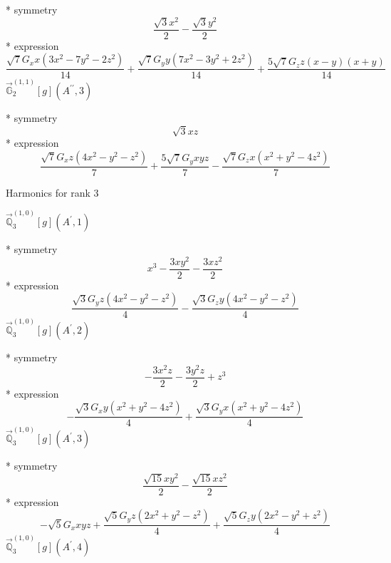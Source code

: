 \documentclass[fleqn,8pt]{jsarticle}
\begin{document}
\noindent\quad ** symmetry
\begin{dmath*}
\frac{\sqrt{3} x^{2}}{2} - \frac{\sqrt{3} y^{2}}{2}
\end{dmath*}
\noindent\quad ** expression
\begin{dmath*}
\frac{\sqrt{7} G_{x} x \left(3 x^{2} - 7 y^{2} - 2 z^{2}\right)}{14} + \frac{\sqrt{7} G_{y} y \left(7 x^{2} - 3 y^{2} + 2 z^{2}\right)}{14} + \frac{5 \sqrt{7} G_{z} z \left(x - y\right) \left(x + y\right)}{14}
\end{dmath*}
\noindent\quad $\vec{\mathbb{G}}_{2}^{(1,1)}[g](A^{\prime\prime},3)$

\noindent\quad ** symmetry
\begin{dmath*}
\sqrt{3} x z
\end{dmath*}
\noindent\quad ** expression
\begin{dmath*}
\frac{\sqrt{7} G_{x} z \left(4 x^{2} - y^{2} - z^{2}\right)}{7} + \frac{5 \sqrt{7} G_{y} x y z}{7} - \frac{\sqrt{7} G_{z} x \left(x^{2} + y^{2} - 4 z^{2}\right)}{7}
\end{dmath*}

\noindent * Harmonics for rank 3

\noindent\quad $\vec{\mathbb{Q}}_{3}^{(1,0)}[g](A^{\prime},1)$

\noindent\quad ** symmetry
\begin{dmath*}
x^{3} - \frac{3 x y^{2}}{2} - \frac{3 x z^{2}}{2}
\end{dmath*}
\noindent\quad ** expression
\begin{dmath*}
\frac{\sqrt{3} G_{y} z \left(4 x^{2} - y^{2} - z^{2}\right)}{4} - \frac{\sqrt{3} G_{z} y \left(4 x^{2} - y^{2} - z^{2}\right)}{4}
\end{dmath*}
\noindent\quad $\vec{\mathbb{Q}}_{3}^{(1,0)}[g](A^{\prime},2)$

\noindent\quad ** symmetry
\begin{dmath*}
- \frac{3 x^{2} z}{2} - \frac{3 y^{2} z}{2} + z^{3}
\end{dmath*}
\noindent\quad ** expression
\begin{dmath*}
- \frac{\sqrt{3} G_{x} y \left(x^{2} + y^{2} - 4 z^{2}\right)}{4} + \frac{\sqrt{3} G_{y} x \left(x^{2} + y^{2} - 4 z^{2}\right)}{4}
\end{dmath*}
\noindent\quad $\vec{\mathbb{Q}}_{3}^{(1,0)}[g](A^{\prime},3)$

\noindent\quad ** symmetry
\begin{dmath*}
\frac{\sqrt{15} x y^{2}}{2} - \frac{\sqrt{15} x z^{2}}{2}
\end{dmath*}
\noindent\quad ** expression
\begin{dmath*}
- \sqrt{5} G_{x} x y z + \frac{\sqrt{5} G_{y} z \left(2 x^{2} + y^{2} - z^{2}\right)}{4} + \frac{\sqrt{5} G_{z} y \left(2 x^{2} - y^{2} + z^{2}\right)}{4}
\end{dmath*}
\noindent\quad $\vec{\mathbb{Q}}_{3}^{(1,0)}[g](A^{\prime},4)$
\end{document}
